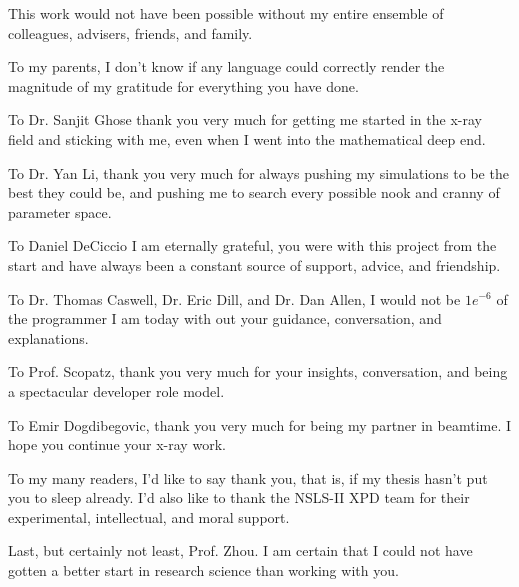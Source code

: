 This work would not have been possible without my entire ensemble of colleagues, advisers, friends, and family.

To my parents, I don't know if any language could correctly render the magnitude of my gratitude for everything you have done.

To Dr. Sanjit Ghose thank you very much for getting me started in the x-ray field and sticking with me, even when I went into the mathematical deep end.

To Dr. Yan Li, thank you very much for always pushing my simulations to be the best they could be, and pushing me to search every possible nook and cranny of parameter space.

To Daniel DeCiccio I am eternally grateful, you were with this project from the start and have always been a constant source of support, advice, and friendship.

To Dr. Thomas Caswell, Dr. Eric Dill, and Dr. Dan Allen, I would not be $1e^{-6}$ of the programmer I am today with out your guidance, conversation, and explanations.

To Prof. Scopatz, thank you very much for your insights, conversation, and being a spectacular developer role model.

To Emir Dogdibegovic, thank you very much for being my partner in beamtime. I hope you continue your x-ray work.

To my many readers, I'd like to say thank you, that is, if my thesis hasn't put you to sleep already.
I'd also like to thank the NSLS-II XPD team for their experimental, intellectual, and moral support.

Last, but certainly not least, Prof. Zhou.
I am certain that I could not have gotten a better start in research science than working with you.
